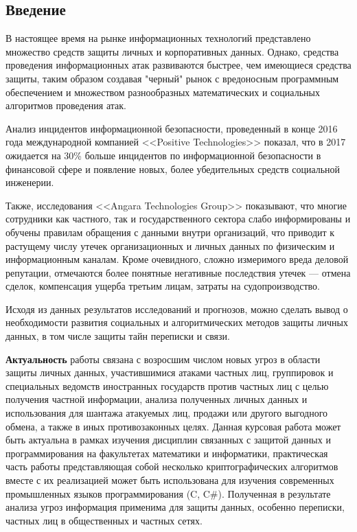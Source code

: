\newpage
\parindent=1cm %
\begin{center}
	\section*{Введение} %
	\pagestyle{plain} %
	\setcounter{page}{3} %
\end{center}

В настоящее время на рынке информационных технологий представлено множество средств защиты личных и корпоративных данных. Однако, средства проведения информационных атак  развиваются  быстрее, чем имеющиеся средства защиты, таким образом создавая "черный"  рынок с вредоносным программным обеспечением  и множеством разнообразных математических и социальных  алгоритмов проведения атак. 

Анализ инцидентов информационной безопасности, проведенный в конце 2016 года международной компанией <<Positive Technologies>> показал, что в 2017 ожидается на 30\% больше инцидентов по информационной безопасности в финансовой сфере и появление новых, более убедительных средств социальной инженерии. %

Также, исследования  <<Angara Technologies Group>> 
показывают, что многие сотрудники  как частного, так и государственного сектора слабо информированы и обучены правилам обращения с данными внутри организаций, что приводит к растущему числу утечек организационных и личных данных по физическим и информационным каналам.  Кроме очевидного,  сложно измеримого вреда деловой репутации, отмечаются  более понятные негативные последствия утечек — отмена сделок, компенсация ущерба третьим лицам, затраты на судопроизводство. %

Исходя из данных результатов исследований и прогнозов, можно сделать вывод о необходимости развития социальных  и алгоритмических  методов защиты личных данных, в том числе защиты тайн переписки и  связи.   

\textbf{Актуальность} работы  связана с возросшим числом новых угроз в области защиты личных данных, участившимися атаками частных лиц, группировок и специальных ведомств иностранных государств против частных лиц с целью получения частной информации, анализа полученных личных данных   и использования для шантажа атакуемых лиц, продажи или другого выгодного обмена, а также  в иных противозаконных целях. Данная курсовая работа может быть актуальна в рамках изучения дисциплин связанных с защитой данных и программирования на факультетах математики и информатики, практическая часть работы представляющая собой несколько криптографических алгоритмов вместе с их реализацией может быть использована для изучения современных промышленных языков программирования (C, C\#). Полученная в результате анализа угроз информация применима для защиты   данных, особенно переписки, частных лиц в общественных и частных сетях. 

